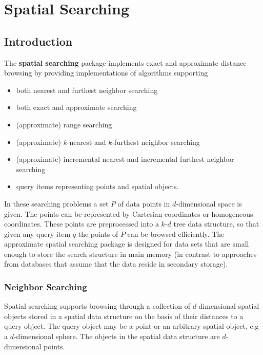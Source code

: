 \chapter{Spatial Searching}

\section{Introduction}

The {\bf spatial searching} package implements
exact and approximate distance browsing
by providing implementations of algorithms supporting

\begin{itemize} 

\item
both nearest and furthest neighbor searching

\item
both exact and approximate searching

\item
(approximate) range searching

\item 
(approximate) $k$-nearest and $k$-furthest neighbor searching

\item 
(approximate) incremental nearest and incremental furthest neighbor searching

\item
query items representing points and spatial objects.

\end{itemize}

In these searching problems a set $P$ of data points in $d$-dimensional
space is given.
The points can be represented by Cartesian coordinates or homogeneous coordinates.
These points are preprocessed into a $k$-$d$ tree data structure, so that given
any query item $q$ the points of $P$ can be browsed efficiently.
The approximate spatial searching package is designed for data sets that are small enough to store
the search structure in main memory (in contrast to approaches
from databases that assume that the data reside in secondary storage).

\subsection{Neighbor Searching}

Spatial searching supports browsing through a collection of $d$-dimensional spatial objects
stored in a spatial data structure on the basis of their distances to a
query object. The query object may be a point or an arbitrary spatial object, e.g a 
$d$-dimensional sphere. The objects in the spatial data structure are $d$-dimensional points.

